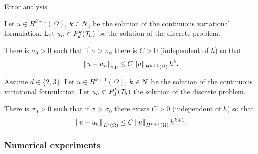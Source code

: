 \begin{frame}{Error analysis}
\small
\begin{theorem}
	\label{theorem:eliptico_orden_norma_SIP}
	Let $u\in H^{k+1}(\Omega)$, $k\in\relax N$, be the solution of the continuous variational formulation. Let $u_h\in\relax{P}_d^k(\mathcal{T}_h)$ be the solution of the discrete problem.
	
	There is $\sigma_0>0$ such that if $\sigma>\sigma_0$ there is $C>0$ (independent of $h$) so that $$\left\|u-u_h\right\|_{\text{sip}}\leq C\left\|u\right\|_{H^{k+1}(\Omega)}h^k.$$
\end{theorem}

%	

\begin{theorem}
	\label{corolario:eliptico_orden_norma_L2}
	Assume $d\in\{2,3\}$. Let $u\in H^{k+1}(\Omega)$, $k\in\relax N$ be the solution of the continuous variational formulation. Let $u_h\in\relax{P}_d^k(\mathcal{T}_h)$ the solution of the discrete problem.
	
	There is $\sigma_0>0$ such that if $\sigma>\sigma_0$ there exists $C>0$ (independent of $h$) so that $$\left\|u-u_h\right\|_{L^2(\Omega)}\leq C\left\|u\right\|_{H^{k+1}(\Omega)}h^{k+1}.$$
\end{theorem}
\end{frame}

	\subsubsection{Numerical experiments}

